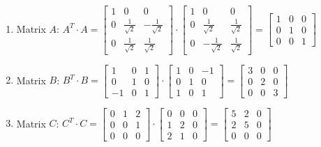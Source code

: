 \documentclass[11pt]{article}
\begin{document}
    \begin{enumerate}
\def\labelenumi{\arabic{enumi}.}
\item
  Matrix $A$: $ A^T \cdot A =
  \begin{bmatrix} 1 & 0 & 0 \\ 0 & \frac{1}{\sqrt{2}} & -\frac{1}{\sqrt{2}} \\ 0 & \frac{1}{\sqrt{2}} & \frac{1}{\sqrt{2}} \end{bmatrix}
  \cdot 
  \begin{bmatrix} 1 & 0 & 0 \\ 0 & \frac{1}{\sqrt{2}} & \frac{1}{\sqrt{2}} \\ 0 & -\frac{1}{\sqrt{2}} & \frac{1}{\sqrt{2}} \end{bmatrix}
  =
  \begin{bmatrix} 1 & 0 & 0 \\ 0 & 1 & 0 \\ 0 & 0 & 1 \end{bmatrix}
  $
\item
  Matrix $B$: $ B^T \cdot B =
  \begin{bmatrix} 1 & 0 & 1 \\ 0 & 1 & 0 \\ -1 & 0 & 1 \end{bmatrix}
  \cdot 
  \begin{bmatrix} 1 & 0 & -1 \\ 0 & 1 & 0 \\ 1 & 0 & 1 \end{bmatrix}
  =
  \begin{bmatrix} 3 & 0 & 0 \\ 0 & 2 & 0 \\ 0 & 0 & 3 \end{bmatrix}
  $
\item
  Matrix $C$: $ C^T \cdot C =
  \begin{bmatrix} 0 & 1 & 2 \\ 0 & 0 & 1 \\ 0 & 0 & 0 \end{bmatrix}
  \cdot 
  \begin{bmatrix} 0 & 0 & 0 \\ 1 & 2 & 0 \\ 2 & 1 & 0 \end{bmatrix}
  =
  \begin{bmatrix} 5 & 2 & 0 \\ 2 & 5 & 0 \\ 0 & 0 & 0 \end{bmatrix}
  $
\end{enumerate}
\end{document}

